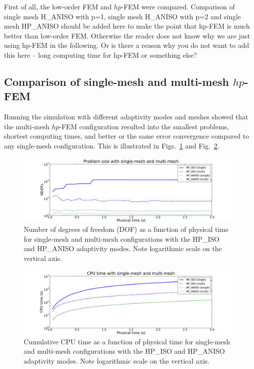 First of all, the low-order FEM and $hp$-FEM were compared.
Comparison of single mesh H\_ANISO with p=1, single mesh H\_ANISO with p=2
and single mesh HP\_ANISO should be added here to make the point that 
hp-FEM is much better than low-order FEM. 
Otherwise the reader does not know 
why we are just using hp-FEM in the following. Or is there a reason 
why you do not want to add this here --  long computing time for hp-FEM or something 
else?

\subsection{Comparison of single-mesh and multi-mesh $hp$-FEM}

Running the simulation with different adaptivity modes 
and meshes showed that the multi-mesh $hp$-FEM configuration resulted into
the smallest problems, shortest computing times, and better or the same error 
convergence compared to any single-mesh configuration.
This is illustrated in Figs.~\ref{fig:singlemultidof} 
and Fig.~\ref{fig:singlemulticpu}.

\begin{figure}[!ht]
  \begin{centering}
  \includegraphics[width=\columnwidth]{singlemulti_dof}
  \caption{\label{fig:singlemultidof} Number of degrees of freedom (DOF) as a function 
  of physical time for single-mesh and multi-mesh configurations with the HP\_ISO
  and HP\_ANISO adaptivity modes. Note logarithmic scale on the vertical axis.}
\vspace{-6mm}
  \end{centering}
\end{figure}


\begin{figure}[!ht]
  \begin{centering}
  \includegraphics[width=\columnwidth]{singlemulti_cpu}
  \caption{\label{fig:singlemulticpu} Cumulative CPU time as a function 
  of physical time for single-mesh and multi-mesh configurations with the HP\_ISO
  and HP\_ANISO adaptivity modes. Note logarithmic scale on the vertical axis.}
  \end{centering}
\end{figure}


